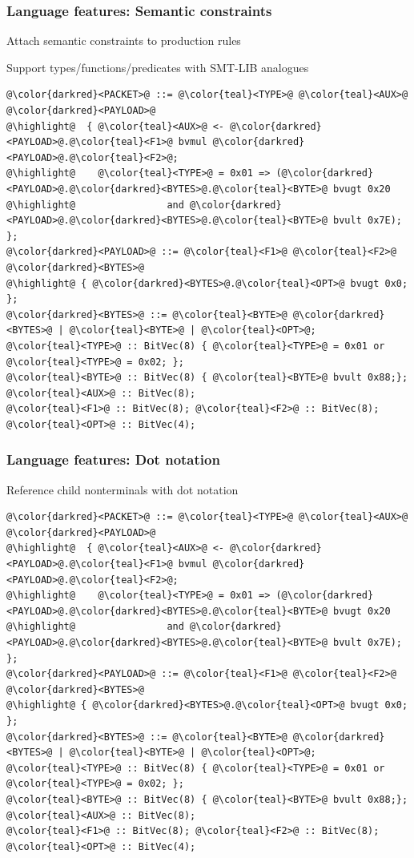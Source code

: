 \documentclass[11pt,xcolor={dvipsnames},hyperref={pdftex,pdfpagemode=UseNone,hidelinks,pdfdisplaydoctitle=true},usepdftitle=false]{beamer}
\newcommand{\green}[1]{\textcolor{green!60!black}{#1}}
\begin{document}
\begin{frame}[fragile]
    \frametitle{Language features: Semantic constraints}\pause
Attach \green{semantic constraints} to production rules

Support types/functions/predicates with \green{SMT-LIB} analogues\\[4pt]
\begin{lstlisting}[style=goblin]
@\color{darkred}<PACKET>@ ::= @\color{teal}<TYPE>@ @\color{teal}<AUX>@ @\color{darkred}<PAYLOAD>@
@\highlight@  { @\color{teal}<AUX>@ <- @\color{darkred}<PAYLOAD>@.@\color{teal}<F1>@ bvmul @\color{darkred}<PAYLOAD>@.@\color{teal}<F2>@;
@\highlight@    @\color{teal}<TYPE>@ = 0x01 => (@\color{darkred}<PAYLOAD>@.@\color{darkred}<BYTES>@.@\color{teal}<BYTE>@ bvugt 0x20 
@\highlight@                and @\color{darkred}<PAYLOAD>@.@\color{darkred}<BYTES>@.@\color{teal}<BYTE>@ bvult 0x7E); };
@\color{darkred}<PAYLOAD>@ ::= @\color{teal}<F1>@ @\color{teal}<F2>@ @\color{darkred}<BYTES>@ 
@\highlight@ { @\color{darkred}<BYTES>@.@\color{teal}<OPT>@ bvugt 0x0; };
@\color{darkred}<BYTES>@ ::= @\color{teal}<BYTE>@ @\color{darkred}<BYTES>@ | @\color{teal}<BYTE>@ | @\color{teal}<OPT>@;
@\color{teal}<TYPE>@ :: BitVec(8) { @\color{teal}<TYPE>@ = 0x01 or @\color{teal}<TYPE>@ = 0x02; };   
@\color{teal}<BYTE>@ :: BitVec(8) { @\color{teal}<BYTE>@ bvult 0x88;}; 
@\color{teal}<AUX>@ :: BitVec(8); 
@\color{teal}<F1>@ :: BitVec(8); @\color{teal}<F2>@ :: BitVec(8); @\color{teal}<OPT>@ :: BitVec(4); 
\end{lstlisting}
\end{frame}

\begin{frame}[fragile]
    \frametitle{Language features: Dot notation}\pause
Reference child nonterminals with \green{dot notation}\\[4pt]
\begin{lstlisting}[style=goblin]
@\color{darkred}<PACKET>@ ::= @\color{teal}<TYPE>@ @\color{teal}<AUX>@ @\color{darkred}<PAYLOAD>@
@\highlight@  { @\color{teal}<AUX>@ <- @\color{darkred}<PAYLOAD>@.@\color{teal}<F1>@ bvmul @\color{darkred}<PAYLOAD>@.@\color{teal}<F2>@;
@\highlight@    @\color{teal}<TYPE>@ = 0x01 => (@\color{darkred}<PAYLOAD>@.@\color{darkred}<BYTES>@.@\color{teal}<BYTE>@ bvugt 0x20 
@\highlight@                and @\color{darkred}<PAYLOAD>@.@\color{darkred}<BYTES>@.@\color{teal}<BYTE>@ bvult 0x7E); };
@\color{darkred}<PAYLOAD>@ ::= @\color{teal}<F1>@ @\color{teal}<F2>@ @\color{darkred}<BYTES>@ 
@\highlight@ { @\color{darkred}<BYTES>@.@\color{teal}<OPT>@ bvugt 0x0; };
@\color{darkred}<BYTES>@ ::= @\color{teal}<BYTE>@ @\color{darkred}<BYTES>@ | @\color{teal}<BYTE>@ | @\color{teal}<OPT>@;
@\color{teal}<TYPE>@ :: BitVec(8) { @\color{teal}<TYPE>@ = 0x01 or @\color{teal}<TYPE>@ = 0x02; };   
@\color{teal}<BYTE>@ :: BitVec(8) { @\color{teal}<BYTE>@ bvult 0x88;}; 
@\color{teal}<AUX>@ :: BitVec(8); 
@\color{teal}<F1>@ :: BitVec(8); @\color{teal}<F2>@ :: BitVec(8); @\color{teal}<OPT>@ :: BitVec(4); 
\end{lstlisting}
\end{frame}
\end{document}
